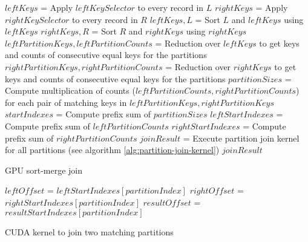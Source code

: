 \documentclass[a4paper,titlepage]{article}
\begin{document}
\begin{algorithm}[ht]
 \label{alg:gpu-sort-merge-join}
 
 $leftKeys$ = Apply $leftKeySelector$ to every record in $L$\;
 $rightKeys$ = Apply $rightKeySelector$ to every record in $R$\;
 $leftKeys, L$ = Sort $L$ and $leftKeys$ using $leftKeys$ \;
 $rightKeys, R$ = Sort $R$ and $rightKeys$ using $rightKeys$ \;
 \;
 $leftPartitionKeys, leftPartitionCounts$ = Reduction over $leftKeys$ to get keys and counts of consecutive equal keys for the partitions \;
 $rightPartitionKeys, rightPartitionCounts$ = Reduction over $rightKeys$ to get keys and counts of consecutive equal keys for the partitions \;
 \;
 $partitionSizes$ = Compute multiplication of counts ($leftPartitionCounts, rightPartitionCounts$) for each pair of matching keys in $leftPartitionKeys, rightPartitionKeys$ \;
 \;
 $startIndexes$ = Compute prefix sum of $partitionSizes$ \;
 $leftStartIndexes$ = Compute prefix sum of $leftPartitionCounts$ \;
 $rightStartIndexes$ = Compute prefix sum of $rightPartitionCounts$ \;
 \;
 $joinResult$ = Execute partition join kernel for all partitions (see algorithm \ref{alg:partition-join-kernel})\;
 \Return $joinResult$ \;
 
 \caption{GPU sort-merge join}
\end{algorithm}

\begin{algorithm}[ht]
 \label{alg:partition-join-kernel}
 $leftOffset$ = $leftStartIndexes[partitionIndex]$ \;
 $rightOffset$ = $rightStartIndexes[partitionIndex]$ \;
 $resultOffset$ = $resultStartIndexes[partitionIndex]$ \;
 \;
 \caption{CUDA kernel to join two matching partitions}
\end{algorithm}
\end{document}
